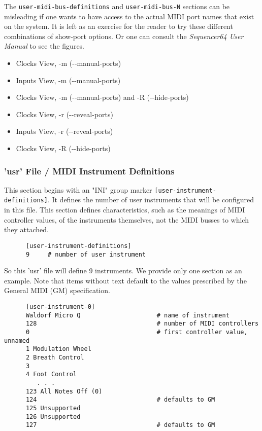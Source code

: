    The \texttt{user-midi-bus-definitions} and \texttt{user-midi-bus-N} sections
   can be misleading if one wants to have access to the
   actual MIDI port names that exist on the system.
   It is left as an exercise for the reader to try these different combinations
   of show-port options.  Or one can consult the \textsl{Sequencer64 User
   Manual} to see the figures.

   \begin{itemize}
      \item Clocks View, -m (-{}-manual-ports)
      \item Inputs View, -m (-{}-manual-ports)
      \item Clocks View, -m (-{}-manual-ports) and -R (-{}-hide-ports)
      \item Clocks View, -r (-{}-reveal-ports)
      \item Inputs View, -r (-{}-reveal-ports)
      \item Clocks View, -R (-{}-hide-ports)
   \end{itemize}

\subsubsection{'usr' File / MIDI Instrument Definitions}
\label{subsubsec:usr_file_midi_instrument_definitions}

   This section begins with an
   "INI" group marker \texttt{[user-instrument-definitions]}.
   It defines the number of user instruments that will be configured in this
   file.  This section defines characteristics, such as
   the meanings of MIDI controller values, of the instruments themselves,
   not the MIDI busses to which they attached.

   \begin{verbatim}
      [user-instrument-definitions]
      9     # number of user instrument
   \end{verbatim}

   So this 'usr' file will define 9 instruments.  We provide only one section
   as an example.  Note that items without text default to the values
   prescribed by the General MIDI (GM) specification.

   \begin{verbatim}
      [user-instrument-0]
      Waldorf Micro Q                     # name of instrument
      128                                 # number of MIDI controllers
      0                                   # first controller value, unnamed
      1 Modulation Wheel
      2 Breath Control
      3 
      4 Foot Control
         . . .
      123 All Notes Off (0)
      124                                 # defaults to GM
      125 Unsupported
      126 Unsupported
      127                                 # defaults to GM
   \end{verbatim}


